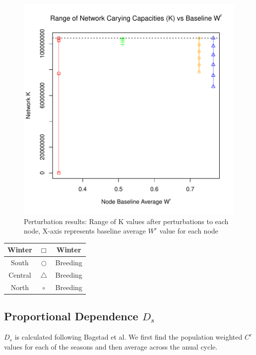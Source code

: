 \documentclass[10pt]{article}
\begin{document}
\vspace{-.5cm}
\begin{figure}[H]
\begin{center}
\includegraphics[width=.8\textwidth, height=.8\textwidth]{RGraphics-monarch_barcr_WR}
\caption{Perturbation results: Range of K values after perturbations to each node, X-axis represents baseline average $W^r$ value for each node}\label{fig:monarch_barcr_WR}
\end{center}
\end{figure}

\vspace{-.5cm}
\begin{tabular}{|c|c|c|}
\hline
{\color{red} Winter} & $\Box$ & Winter \\
\hline
{\color{orange} South} & $\bigcirc$ & Breeding \\
\hline
{\color{blue} Central} & $\triangle$ &  Breeding \\
\hline
{\color{green} North} & $\circ$ & Breeding \\
\hline
\end{tabular}




\newpage
\subsection{Proportional Dependence \texorpdfstring{$D_s$}{DS}}

$D_s$ is calculated following Bagstad et al. We first find the population weighted $C^r$ values for each of the seasons and then average across the anual cycle.
\end{document}
